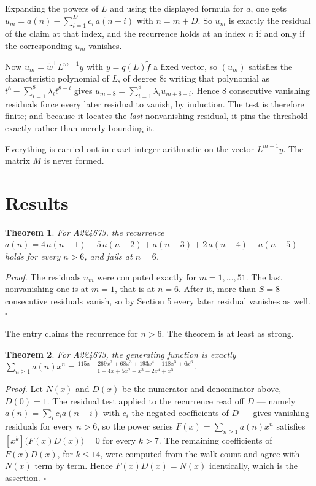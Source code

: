\documentclass[11pt]{article}
\newtheorem{theorem}{Theorem}
\theoremstyle{definition}
\begin{document}
Expanding the powers of $L$ and using the displayed formula for $a$, one gets $u_m = a(n) - \sum_{i=1}^{D} c_i\,a(n-i)$ with $n = m + D$. So $u_m$ is exactly the residual of the claim at that index, and the recurrence holds at an index $n$ if and only if the corresponding $u_m$ vanishes.

Now $u_m = \tilde w^{\mathsf T} L^{m-1} y$ with $y = q(L)\tilde f$ a fixed vector, so $(u_m)$ satisfies the characteristic polynomial of $L$, of degree $8$: writing that polynomial as $t^{8} - \sum_{i=1}^{8} \lambda_i t^{8-i}$ gives $u_{m+8} = \sum_{i=1}^{8} \lambda_i u_{m+8-i}$. Hence $8$ consecutive vanishing residuals force every later residual to vanish, by induction. The test is therefore finite; and because it locates the {\itshape last} nonvanishing residual, it pins the threshold exactly rather than merely bounding it.

Everything is carried out in exact integer arithmetic on the vector $L^{m-1}y$. The matrix $M$ is never formed.

\section{Results}

\begin{theorem} For A224673, the recurrence $a(n) = 4\,a(n-1) - 5\,a(n-2) + a(n-3) + 2\,a(n-4) - a(n-5)$ holds for every $n > 6$, and fails at $n = 6$.\end{theorem}

{\itshape Proof.} The residuals $u_m$ were computed exactly for $m = 1,\dots,51$. The last nonvanishing one is at $m = 1$, that is at $n = 6$. After it, more than $S = 8$ consecutive residuals vanish, so by Section 5 every later residual vanishes as well. $\square$

The entry claims the recurrence for $n > 6$. The theorem is at least as strong.

\begin{theorem} For A224673, the generating function is exactly $\sum_{n\ge 1} a(n)x^n = \frac{115x - 269x^{2} + 68x^{3} + 193x^{4} - 118x^{5} + 6x^{6}}{1 - 4x + 5x^{2} - x^{3} - 2x^{4} + x^{5}}$.\end{theorem}

{\itshape Proof.} Let $N(x)$ and $D(x)$ be the numerator and denominator above, $D(0)=1$. The residual test applied to the recurrence read off $D$ --- namely $a(n) = \sum_i c_i a(n-i)$ with $c_i$ the negated coefficients of $D$ --- gives vanishing residuals for every $n > 6$, so the power series $F(x)=\sum_{n\ge 1}a(n)x^n$ satisfies $[x^k]\bigl(F(x)D(x)\bigr) = 0$ for every $k > 7$. The remaining coefficients of $F(x)D(x)$, for $k \le 14$, were computed from the walk count and agree with $N(x)$ term by term. Hence $F(x)D(x) = N(x)$ identically, which is the assertion. $\square$
\end{document}
